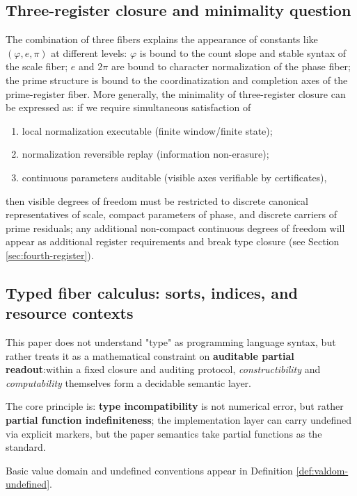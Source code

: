 \subsection{Three-register closure and minimality question}
The combination of three fibers explains the appearance of constants like $(\varphi,e,\pi)$ at different levels: $\varphi$ is bound to the count slope and stable syntax of the scale fiber; $e$ and $2\pi$ are bound to character normalization of the phase fiber; the prime structure is bound to the coordinatization and completion axes of the prime-register fiber. More generally, the minimality of three-register closure can be expressed as: if we require simultaneous satisfaction of
\begin{enumerate}[label=(\roman*), ref=\roman*]
  \item local normalization executable (finite window/finite state);
  \item normalization reversible replay (information non-erasure);
  \item continuous parameters auditable (visible axes verifiable by certificates),
\end{enumerate}
then visible degrees of freedom must be restricted to discrete canonical representatives of scale, compact parameters of phase, and discrete carriers of prime residuals; any additional non-compact continuous degrees of freedom will appear as additional register requirements and break type closure (see Section \ref{sec:fourth-register}).\par

\subsection{Typed fiber calculus: sorts, indices, and resource contexts}\label{subsec:typed-fiber-calculus}
This paper does not understand "type" as programming language syntax, but rather treats it as a mathematical constraint on \textbf{auditable partial readout}:within a fixed closure and auditing protocol, \emph{constructibility} and \emph{computability} themselves form a decidable semantic layer.\par
The core principle is: \textbf{type incompatibility} is not numerical error, but rather \textbf{partial function indefiniteness}; the implementation layer can carry undefined via explicit markers, but the paper semantics take partial functions as the standard.\par
Basic value domain and undefined conventions appear in Definition \ref{def:valdom-undefined}.\par


